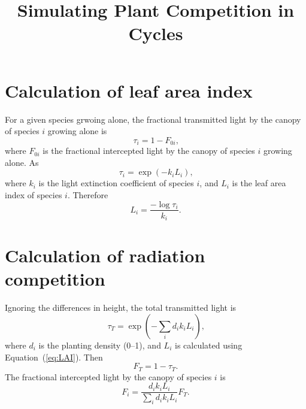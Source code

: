 \documentclass[11pt]{article}
\begin{document}
\title{Simulating Plant Competition in Cycles}
\maketitle
\section{Calculation of leaf area index}
For a given species grwoing alone, the fractional transmitted light by the canopy of species $i$ growing alone is
\begin{equation}\label{eq:LAI}
\tau_i = 1 - F_{0i} \text{,}
\end{equation}
where $F_{0i}$ is the fractional intercepted light by the canopy of species $i$ growing alone.
As
\begin{equation}
\tau_i = \exp\left(-k_i L_i\right) \text{,}
\end{equation}
where $k_i$ is the light extinction coefficient of species $i$, and $L_i$ is the leaf area index of species $i$.
Therefore
\begin{equation}
L_i = \frac{-\log \tau_i}{k_i} \text{.}
\end{equation}

\section{Calculation of radiation competition}
Ignoring the differences in height, the total transmitted light is
\begin{equation}
\tau_T = \exp\left(-\sum_i d_i k_i L_i\right) \text{,}
\end {equation}
where $d_i$ is the planting density (0--1), and $L_i$ is calculated using Equation~(\ref{eq:LAI}).
Then
\begin{equation}
F_T = 1 - \tau_T \text{.}
\end{equation}
The fractional intercepted light by the canopy of species $i$ is
\begin{equation}
F_i = \frac{d_i k_i L_i}{\sum_i d_i k_i L_i} F_T \text{.}
\end{equation}

%

%
\end{document}
